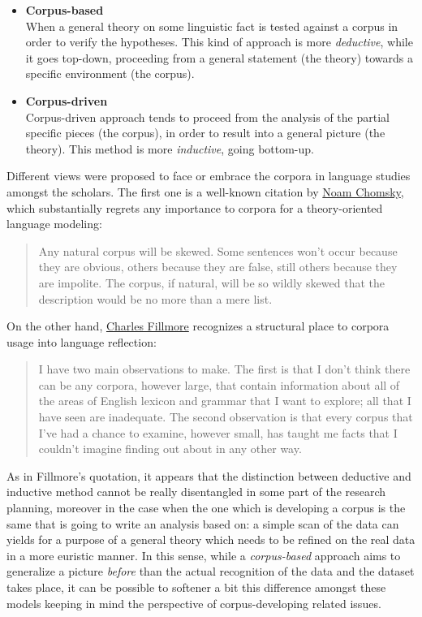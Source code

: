 \documentclass[a4paper,twoside,12pt,chapterprefix=false,bibliography=totocnumbered,listof=flat]{scrbook}
\theoremstyle{definition}
\theoremstyle{definition}
\theoremstyle{definition}
\theoremstyle{remark}
\begin{document}
\begin{itemize}
\item
  \textbf{Corpus-based}\\
  When a general theory on some linguistic fact is tested against a
  corpus in order to verify the hypotheses. This kind of approach is
  more \emph{deductive}, while it goes top-down, proceeding from a
  general statement (the theory) towards a specific environment (the
  corpus).
\item
  \textbf{Corpus-driven}\\
  Corpus-driven approach tends to proceed from the analysis of the
  partial specific pieces (the corpus), in order to result into a
  general picture (the theory). This method is more \emph{inductive},
  going bottom-up.
\end{itemize}

Different views were proposed to face or embrace the corpora in language
studies amongst the scholars. The first one is a well-known citation by
\href{https://en.wikipedia.org/wiki/Noam_Chomsky}{Noam Chomsky}, which
substantially regrets any importance to corpora for a theory-oriented
language modeling:

\begin{quote}
Any natural corpus will be skewed. Some sentences won't occur because
they are obvious, others because they are false, still others because
they are impolite. The corpus, if natural, will be so wildly skewed that
the description would be no more than a mere list. \citep[Chomsky 1962,
\emph{A transformational approach to syntax} in][]{togninibonelli2001}
\end{quote}

On the other hand,
\href{https://en.wikipedia.org/wiki/Charles_J._Fillmore}{Charles
Fillmore} recognizes a structural place to corpora usage into language
reflection:

\begin{quote}
I have two main observations to make. The first is that I don't think
there can be any corpora, however large, that contain information about
all of the areas of English lexicon and grammar that I want to explore;
all that I have seen are inadequate. The second observation is that
every corpus that I've had a chance to examine, however small, has
taught me facts that I couldn't imagine finding out about in any other
way. \citep{fillmore1992}
\end{quote}

As in Fillmore's quotation, it appears that the distinction between
deductive and inductive method cannot be really disentangled in some
part of the research planning, moreover in the case when the one which
is developing a corpus is the same that is going to write an analysis
based on: a simple scan of the data can yields for a purpose of a
general theory which needs to be refined on the real data in a more
euristic manner. In this sense, while a \emph{corpus-based} approach
aims to generalize a picture \emph{before} than the actual recognition
of the data and the dataset takes place, it can be possible to softener
a bit this difference amongst these models keeping in mind the
perspective of corpus-developing related issues.
\end{document}
